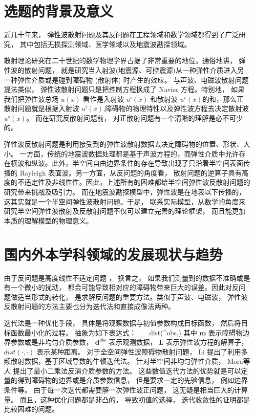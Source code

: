 \section{选题的背景及意义}
近几十年来， 弹性波散射问题及其反问题在工程领域和数学领域都得到了广泛研究\cite{landau}， 其中包括无损探测领域、医学领域以及地震波勘探领域。

散射理论研究在二十世纪的数学物理学界占据了非常重要的地位。通俗地讲， 弹性波的散射问题， 就是研究当入射波(地震源、可控震源)从一种弹性介质进入另一种弹性介质或是碰到障碍物 (散射体) 时产生的效应。 与声波、电磁波散射问题提法类似， 弹性波散射问题只是把控制方程换成了 Navier 方程。特别地， 如果我们把弹性波总场 $u(x)$ 看作是入射波 $u^i(x)$ 和散射波 $u^s(x)$的和，那么正散射问题就是根据入射波 $u^i(x)$,障碍物的物理特性以及弹性波方程去决定散射波 $u^s(x)$。 而在研究反散射问题前， 对正散射问题有一个清晰的理解是必不可少的。

弹性波反散射问题是利用接受到的弹性波散射数据去决定障碍物的位置、形状、大小。 一方面，传统的地震波数据处理都是基于声波方程的，而弹性介质中允许存在横波和纵波。此外，半空间自由边界条件的存在导致出现了只沿着半空间表面传播的 Rayleigh 表面波。另一方面，从反问题的角度看， 散射问题的逆算子具有高度的不适定性及非线性性。因此，上述所有的困难都给半空间弹性波反散射问题的研究带来挑战及吸引力。 而在地震波勘探模型中，弹性波是在地表以下传播的，这其实就是一个半空间弹性波散射问题。于是， 联系实际模型，从数学的角度来研究半空间弹性波散射及反散射问题不仅可以建立完善的理论框架， 而且能更加本质的理解模型的物理意义。


\section{国内外本学科领域的发展现状与趋势}
由于反问题是高度线性不适定问题 \cite{hadamard1923lectures}， 换言之， 如果我们测量到的数据不准确或是有一个微小的扰动， 都会可能导致相对应的障碍物带来巨大的误差。因此对反问题做适当形式的转化， 是求解反问题的重要方法。类似于声波、电磁波， 弹性波反散射问题的方法主要也分为迭代法和直接成像法两种。 

迭代法是一种优化手段， 具体是将观察数据与初值参数构成目标函数， 然后将目标函数最小化的过程。 抽象为如下表达式：
\ben
\min_{} \ dist(^{obs},)
\een
其中 $\mathbf m$ 表示障碍物边界参数或是非均匀介质参数， $\mathbf{d}^{obs}$ 表示观测数据， $\mathbf{{L}}$ 表示弹性波方程的解算子， $dist(\cdot,\cdot)$ 表示某种距离。
对于全空间弹性波障碍物散射问题， Li \cite{li2016inverse} 提出了利用多频散射数据，基于区域导数的牛顿迭代法。 针对半空间非均匀弹性介质， Mora等人 \cite{mora1987nonlinear} 提出了最小二乘法反演介质参数的方法。 这些数值迭代方法的优势就是可以定量的得到障碍物的边界或是介质参数信息， 但是要求一定的先验信息， 例如边界条件等。 由于每一次迭代都需要解一次弹性波正问题， 这无疑是相当巨大的计算量。 而且，这种优化问题都是非凸的， 导致初值的选择， 迭代收敛性的证明都是比较困难的问题。 

